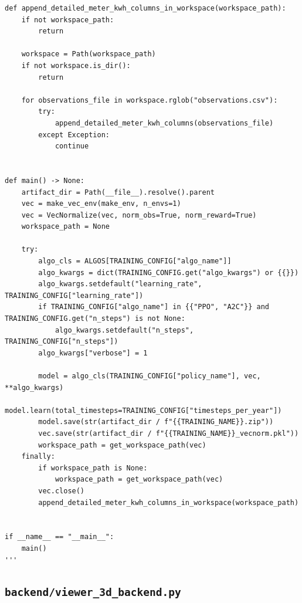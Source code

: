 \documentclass[10pt,a4paper]{article}
\begin{document}
\begin{lstlisting}[style=studioPython,caption={backend/training\_scripts.py},label={lst:backend-training-scripts-py}]
def append_detailed_meter_kwh_columns_in_workspace(workspace_path):
    if not workspace_path:
        return

    workspace = Path(workspace_path)
    if not workspace.is_dir():
        return

    for observations_file in workspace.rglob("observations.csv"):
        try:
            append_detailed_meter_kwh_columns(observations_file)
        except Exception:
            continue


def main() -> None:
    artifact_dir = Path(__file__).resolve().parent
    vec = make_vec_env(make_env, n_envs=1)
    vec = VecNormalize(vec, norm_obs=True, norm_reward=True)
    workspace_path = None

    try:
        algo_cls = ALGOS[TRAINING_CONFIG["algo_name"]]
        algo_kwargs = dict(TRAINING_CONFIG.get("algo_kwargs") or {{}})
        algo_kwargs.setdefault("learning_rate", TRAINING_CONFIG["learning_rate"])
        if TRAINING_CONFIG["algo_name"] in {{"PPO", "A2C"}} and TRAINING_CONFIG.get("n_steps") is not None:
            algo_kwargs.setdefault("n_steps", TRAINING_CONFIG["n_steps"])
        algo_kwargs["verbose"] = 1

        model = algo_cls(TRAINING_CONFIG["policy_name"], vec, **algo_kwargs)
        model.learn(total_timesteps=TRAINING_CONFIG["timesteps_per_year"])
        model.save(str(artifact_dir / f"{{TRAINING_NAME}}.zip"))
        vec.save(str(artifact_dir / f"{{TRAINING_NAME}}_vecnorm.pkl"))
        workspace_path = get_workspace_path(vec)
    finally:
        if workspace_path is None:
            workspace_path = get_workspace_path(vec)
        vec.close()
        append_detailed_meter_kwh_columns_in_workspace(workspace_path)


if __name__ == "__main__":
    main()
'''
\end{lstlisting}


\subsection{\texorpdfstring{\texttt{backend/viewer\_3d\_backend.py}}{backend/viewer\_3d\_backend.py}}
\end{document}
